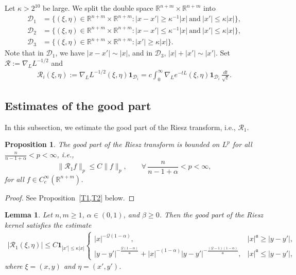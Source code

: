 \documentclass[12pt]{amsart}
\newtheorem{proposition}[theorem]{Proposition}
\newtheorem{lemma}[theorem]{Lemma}
\begin{document}
Let $\kappa > 2^{10}$ be large. We split the double space $\mathbb{R}^{n+m}\times \mathbb{R}^{n+m}$ into
\begin{align*} 
    \mathcal{D}_1 &= \{(\xi,\eta)\in \mathbb{R}^{n+m}\times \mathbb{R}^{n+m}: |x-x'| \ge \kappa^{-1} |x| \ \text{and}\ |x'| \le \kappa |x| \},\\
    \mathcal{D}_2 &= \{(\xi,\eta)\in \mathbb{R}^{n+m}\times \mathbb{R}^{n+m}: |x-x'| \le \kappa^{-1} |x| \ \text{and}\ |x'| \le \kappa |x| \},\\
    \mathcal{D}_3 &= \{(\xi,\eta)\in \mathbb{R}^{n+m}\times \mathbb{R}^{n+m}: |x'| \ge \kappa |x| \}.
\end{align*}
Note that in $\mathcal{D}_1$, we have $|x-x'| \sim |x|$, and in $\mathcal{D}_3$, $|x|+|x'|\sim |x'|$. Set $\mathcal R:= \nabla_L L^{-1/2}$ and
\begin{align*}
    \mathcal{R}_i(\xi,\eta) := \nabla_L L^{-1/2}(\xi,\eta) \mathbf{1}_{\mathcal{D}_i} = c \int_0^\infty \nabla_L e^{-tL}(\xi,\eta) \mathbf{1}_{\mathcal{D}_i} \, \frac{dt}{\sqrt{t}}.
\end{align*}





\subsection{Estimates of the good part}

In this subsection, we estimate the good part of the Riesz transform, i.e., $\mathcal{R}_1$.






\begin{proposition}\label{R1}
The good part of the Riesz transform is bounded on $L^p$ for all $\frac{n}{n-1+\alpha}<p< \infty$, i.e.,
\begin{equation*}
    \| \mathcal{R}_1f\|_{p}\le C \|f\|_p,\qquad \forall\,
     \frac{n}{n-1+\alpha}<p< \infty,
\end{equation*}
for all $f\in C_c^\infty(\mathbb{R}^{n+m})$.
\end{proposition}

\begin{proof}
See Proposition~\ref{T1,T2} below.
\end{proof}

\begin{lemma}\label{kernel_good}
Let $n,m\ge 1$, $\alpha\in (0,1)$, and $\beta \ge 0$. Then the good part of the Riesz kernel satisfies the estimate
\begin{align}\label{eq_kernel_good}
    |\mathcal{R}_1(\xi,\eta)| \le C\mathbf{1}_{|x'|\le \kappa|x|} \begin{cases}
        |x|^{-\mathcal{Q}(1-\alpha)}, & |x|^{\mathfrak a} \ge |y-y'|,\\[4pt]
        |y-y'|^{-\frac{\mathcal{Q}(1-\alpha)}{\mathfrak a}} + |x|^{-(1-\alpha)} |y-y'|^{-\frac{(\mathcal{Q}-1)(1-\alpha)}{\mathfrak a}}, & |x|^{\mathfrak a} \le |y-y'|,
    \end{cases}
\end{align}
where $\xi=(x,y)$ and $\eta= (x',y')$.
\end{lemma}
\end{document}
